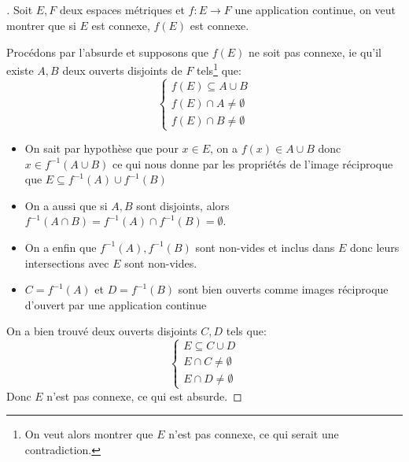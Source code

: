 \documentclass{report}
\begin{document}
      \subsection*{}
      \begin{proof}[\unskip\nopunct]
         Soit \(E, F\) deux espaces métriques et \(f : E \rightarrow F\) une application continue, on veut montrer que si \(E\) est connexe, \(f(E)\) est connexe.\<

         Procédons par l'absurde et supposons que \(f(E)\) ne soit pas connexe, ie qu'il existe \(A, B\) deux ouverts disjoints de \(F\) tels\footnote[1]{On veut alors montrer que \(E\) n'est pas connexe, ce qui serait une contradiction.} que:
         \[
            \begin{cases}
               f(E) \subseteq A \cup B\\
               f(E) \cap A \neq \emptyset\\
               f(E) \cap B \neq \emptyset
            \end{cases}   
         \]
         \begin{itemize}
            \item On sait par hypothèse que pour \(x \in E\), on a \(f(x) \in A \cup B\) donc \(x \in f^{-1}(A \cup B)\) ce qui nous donne par les propriétés de l'image réciproque que \(E \subseteq f^{-1}(A) \cup f^{-1}(B)\)
            \item On a aussi que si \(A, B\) sont disjoints, alors \(f^{-1}(A \cap B) = f^{-1}(A) \cap f^{-1}(B) = \emptyset\).
            \item On a enfin que \(f^{-1}(A), f^{-1}(B)\) sont non-vides et inclus dans \(E\) donc leurs intersections avec \(E\) sont non-vides.
            \item \(C = f^{-1}(A)\) et  \(D = f^{-1}(B)\) sont bien ouverts comme images réciproque d'ouvert par une application continue
         \end{itemize}
         On a bien trouvé deux ouverts disjoints \(C, D\) tels que:
         \[
            \begin{cases}
               E \subseteq C \cup D\\
               E \cap C \neq \emptyset\\
               E \cap D \neq \emptyset
            \end{cases}   
         \]
         Donc \(E\) n'est pas connexe, ce qui est absurde.
      \end{proof}     
\end{document}
